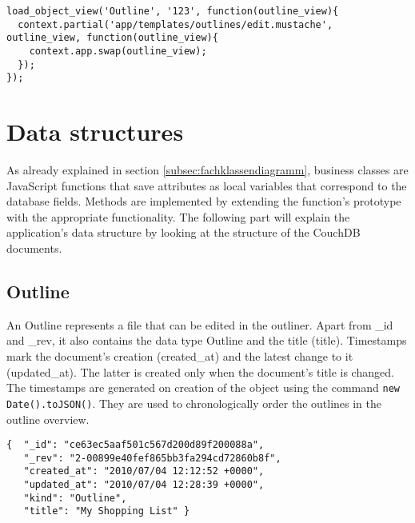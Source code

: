 \lstset{language=javascript}
\medskip 
\begin{lstlisting}[label=code:resources-apply, caption=Rendering of the outline editing template]
load_object_view('Outline', '123', function(outline_view){
  context.partial('app/templates/outlines/edit.mustache', outline_view, function(outline_view){
    context.app.swap(outline_view);
  });
});
\end{lstlisting}




\section{Data structures}
\label{sec:datenstruktur}

As already explained in section \ref{subsec:fachklassendiagramm}, business classes are JavaScript functions that save attributes as local variables that correspond to the database fields. Methods are implemented by extending the function's prototype with the appropriate functionality. The following part will explain the application's data structure by looking at the structure of the CouchDB documents.


\subsection{Outline}



An {\selectfont Outline} represents a file that can be edited in the outliner. Apart from {\selectfont\_id} and {\selectfont\_rev}, it also contains the data type {\selectfont Outline} and the title ({\selectfont title}). Timestamps mark the document's creation ({\selectfont created\_at}) and the latest change to it ({\selectfont updated\_at}). The latter is created only when the document's title is changed. The timestamps are generated on creation of the object using the command \lstinline!new Date().toJSON()!. They are used to chronologically order the outlines in the outline overview.

\medskip 
\begin{lstlisting}[label=code:outline-example, caption=An Outline document]
{  "_id": "ce63ec5aaf501c567d200d89f200088a",
   "_rev": "2-00899e40fef865bb3fa294cd72860b8f",
   "created_at": "2010/07/04 12:12:52 +0000",
   "updated_at": "2010/07/04 12:28:39 +0000",
   "kind": "Outline",
   "title": "My Shopping List" }
\end{lstlisting}


